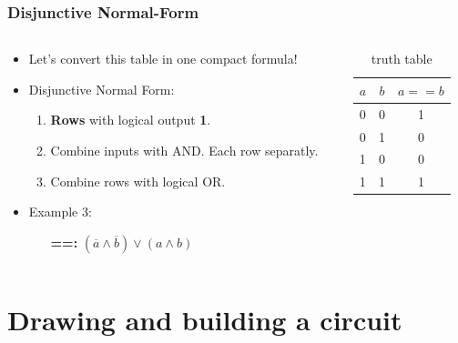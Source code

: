 \documentclass{beamer}
\begin{document}
\begin{frame}\frametitle{Disjunctive Normal-Form}
  
  \begin{columns}
  \begin{column}{6cm}
  \begin{itemize}
    \item Let's convert this table in one compact formula!
    \item Disjunctive Normal Form:
    \begin{enumerate}
     \item \textbf{Rows} with logical output \textbf{1}.
     \item Combine inputs with AND. Each row separatly.
     \item Combine rows with logical OR.
    \end{enumerate}
    \item Example 3: 
    \begin{itemize}
      \item [\textbf{==:}]$(\overline{a}\land \overline{b})\lor(a\land b)$
    \end{itemize}
  \end{itemize}
  \end{column}
  
    
  \begin{column}{6cm}
  \begin{table}[H]
  \centering
  \begin{tabular}{c|c||c}
  \textbf{$a$} & \textbf{$b$} & \textbf{$a == b$} \\ \hline
  0          & 0          & 1      \\
  0          & 1          & 0  \\
  1          & 0          & 0   \\
  1          & 1          & 1 
  \end{tabular}
  \caption{truth table}
  \label{tab:truth}
  \end{table}
  \end{column}
  
  \end{columns}  
  
  
  
\end{frame}






\section{Drawing and building a circuit}
\frame{\tableofcontents[currentsection]}
\end{document}
